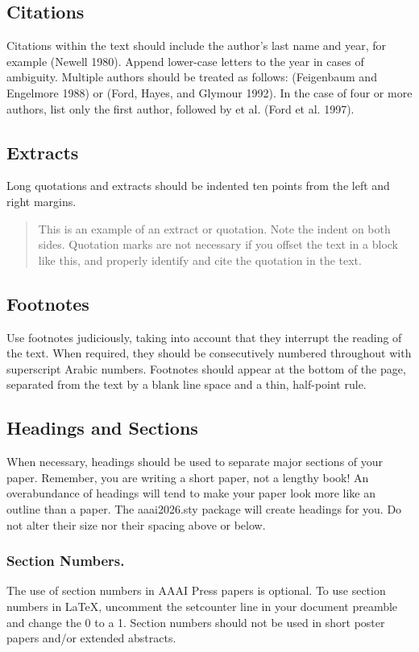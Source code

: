 \subsection{Citations}
Citations within the text should include the author's last name and year, for example (Newell 1980). Append lower-case letters to the year in cases of ambiguity. Multiple authors should be treated as follows: (Feigenbaum and Engelmore 1988) or (Ford, Hayes, and Glymour 1992). In the case of four or more authors, list only the first author, followed by et al. (Ford et al. 1997).

\subsection{Extracts}
Long quotations and extracts should be indented ten points from the left and right margins.

\begin{quote}
This is an example of an extract or quotation. Note the indent on both sides. Quotation marks are not necessary if you offset the text in a block like this, and properly identify and cite the quotation in the text.

\end{quote}

\subsection{Footnotes}
Use footnotes judiciously, taking into account that they interrupt the reading of the text. When required, they should be consecutively numbered throughout with superscript Arabic numbers. Footnotes should appear at the bottom of the page, separated from the text by a blank line space and a thin, half-point rule.

\subsection{Headings and Sections}
When necessary, headings should be used to separate major sections of your paper. Remember, you are writing a short paper, not a lengthy book! An overabundance of headings will tend to make your paper look more like an outline than a paper. The aaai2026.sty package will create headings for you. Do not alter their size nor their spacing above or below.

\subsubsection{Section Numbers.}
The use of section numbers in AAAI Press papers is optional. To use section numbers in \LaTeX{}, uncomment the setcounter line in your document preamble and change the 0 to a 1. Section numbers should not be used in short poster papers and/or extended abstracts.

